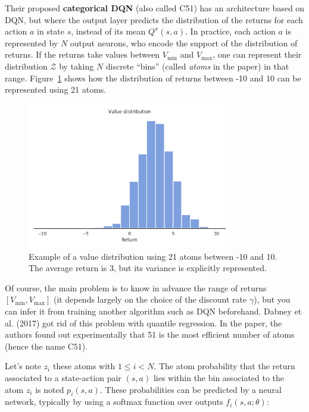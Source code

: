 \documentclass[
  letterpaper,
  DIV=11,
  numbers=noendperiod]{scrreprt}
\begin{document}
Their proposed \textbf{categorical DQN} (also called C51) has an
architecture based on DQN, but where the output layer predicts the
distribution of the returns for each action \(a\) in state \(s\),
instead of its mean \(Q^\pi(s, a)\). In practice, each action \(a\) is
represented by \(N\) output neurons, who encode the support of the
distribution of returns. If the returns take values between
\(V_\text{min}\) and \(V_\text{max}\), one can represent their
distribution \(\mathcal{Z}\) by taking \(N\) discrete ``bins'' (called
\emph{atoms} in the paper) in that range.
Figure~\ref{fig-distributionallearning} shows how the distribution of
returns between -10 and 10 can be represented using 21 atoms.

\begin{figure}

{\centering \includegraphics[width=0.8\textwidth,height=\textheight]{./img/distributionallearning.png}

}

\caption{\label{fig-distributionallearning}Example of a value
distribution using 21 atoms between -10 and 10. The average return is 3,
but its variance is explicitly represented.}

\end{figure}

Of course, the main problem is to know in advance the range of returns
\([V_\text{min}, V_\text{max}]\) (it depends largely on the choice of
the discount rate \(\gamma\)), but you can infer it from training
another algorithm such as DQN beforehand. Dabney et al. (2017) got rid
of this problem with quantile regression. In the paper, the authors
found out experimentally that 51 is the most efficient number of atoms
(hence the name C51).

Let's note \(z_i\) these atoms with \(1 \leq i < N\). The atom
probability that the return associated to a state-action pair \((s, a)\)
lies within the bin associated to the atom \(z_i\) is noted
\(p_i(s, a)\). These probabilities can be predicted by a neural network,
typically by using a softmax function over outputs
\(f_i(s, a; \theta)\):
\end{document}
